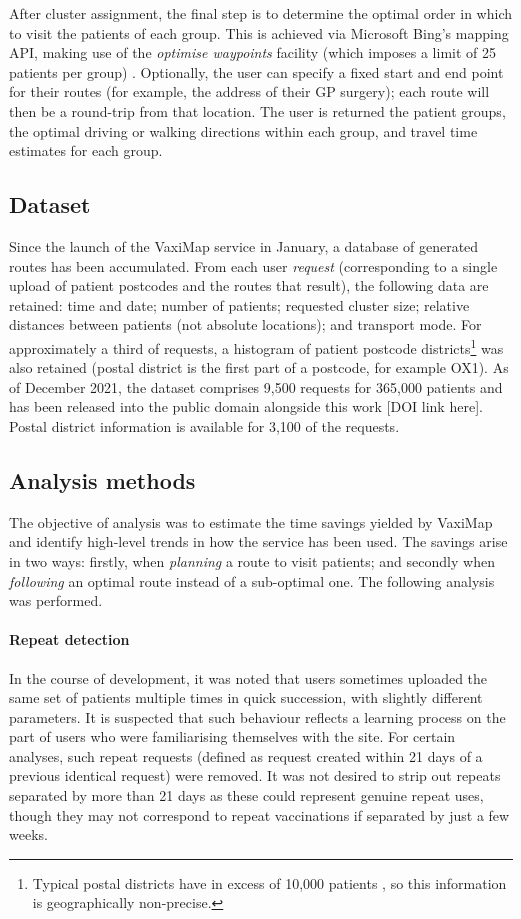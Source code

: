 \documentclass[review]{elsarticle}
\def\vm{VaxiMap}
\begin{document}
After cluster assignment, the final step is to determine the optimal order in which to visit the patients of each group. This is achieved via Microsoft Bing’s mapping API, making use of the \textit{optimise waypoints} facility (which imposes a limit of 25 patients per group) \cite{msbing}. Optionally, the user can specify a fixed start and end point for their routes (for example, the address of their GP surgery); each route will then be a round-trip from that location. The user is returned the patient groups, the optimal driving or walking directions within each group, and travel time estimates for each group. 

\subsection{Dataset}

Since the launch of the \vm{} service in January, a database of generated routes has been accumulated. From each user \textit{request} (corresponding to a single upload of patient postcodes and the routes that result), the following data are retained: time and date; number of patients; requested cluster size; relative distances between patients (not absolute locations); and transport mode. For approximately a third of requests, a histogram of patient postcode districts\footnote{Typical postal districts have in excess of 10,000 patients \cite{OfficeforNationalStatistics}, so this information is geographically non-precise.} was also retained (postal district is the first part of a postcode, for example OX1). As of December 2021, the dataset comprises 9,500 requests for 365,000 patients and has been released into the public domain alongside this work [DOI link here]. Postal district information is available for 3,100 of the requests. 

\subsection{Analysis methods}

The objective of analysis was to estimate the time savings yielded by \vm{} and identify high-level trends in how the service has been used. The savings arise in two ways: firstly, when \textit{planning} a route to visit patients; and secondly when \textit{following} an optimal route instead of a sub-optimal one. The following analysis was performed. 

\paragraph{Repeat detection}
In the course of development, it was noted that users sometimes uploaded the same set of patients multiple times in quick succession, with slightly different parameters. It is suspected that such behaviour reflects a learning process on the part of users who were familiarising themselves with the site. For certain analyses, such repeat requests (defined as request created within 21 days of a previous identical request) were removed. It was not desired to strip out repeats separated by more than 21 days as these could represent genuine repeat uses, though they may not correspond to repeat vaccinations if separated by just a few weeks. 
\end{document}
